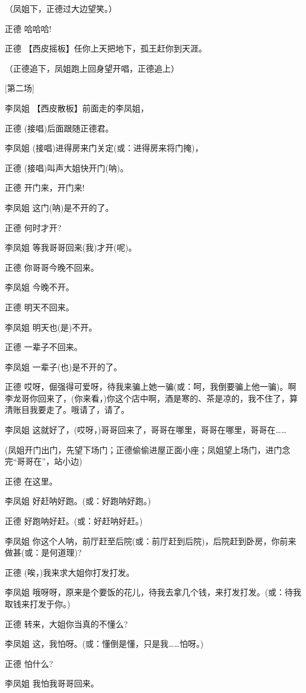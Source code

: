（凤姐下，正德过大边望笑。）

正德 哈哈哈!

正德 【西皮摇板】任你上天把地下，孤王赶你到天涯。

（正德追下，凤姐跑上回身望开唱，正德追上）

{[}第二场{]}

李凤姐 【西皮散板】前面走的李凤姐，

正德 (接唱)后面跟随正德君。

李凤姐 (接唱)进得房来门关定(或：进得房来将门掩)，

正德 (接唱)叫声大姐快开门(呐)。

正德 开门来，开门来!

李凤姐 这门(呐)是不开的了。

正德 何时才开?

李凤姐 等我哥哥回来(我)才开(呢)。

正德 你哥哥今晚不回来。

李凤姐 今晚不开。

正德 明天不回来。

李凤姐 明天也(是)不开。

正德 一辈子不回来。

李凤姐 一辈子(也)是不开的了。

正德
哎呀，倔强得可爱呀，待我来骗上她一骗(或：呵，我倒要骗上他一骗)。啊李龙哥你回来了，(你来看，)你这个店中啊，酒是寒的、茶是凉的，我不住了，算清账目我要走了。哦请了，请了。

李凤姐
这就好了，(哎呀，)哥哥回来了，哥哥在哪里，哥哥在哪里，哥哥在\ldots{}\ldots{}

(凤姐开门出门，先望下场门；正德偷偷进屋正面小座；凤姐望上场门，进门念完``哥哥在''，站小边)

正德 在这里。

李凤姐 好赶呐好跑。(或：好跑呐好跑。)

正德 好跑呐好赶。(或：好赶呐好赶。)

李凤姐
你这个人呐，前厅赶至后院(或：前厅赶到后院)，后院赶到卧房，你前来做甚(或：是何道理)?

正德 (唉，)我来求大姐你打发打发。

李凤姐
哦呀呀，原来是个要饭的花儿，待我去拿几个钱，来打发打发。(或：待我取钱来打发于你。)

正德 转来，大姐你当真的不懂么?

李凤姐 这，我怕呀。(或：懂倒是懂，只是我\ldots{}\ldots{}怕呀。)

正德 怕什么?

李凤姐 我怕我哥哥回来。

